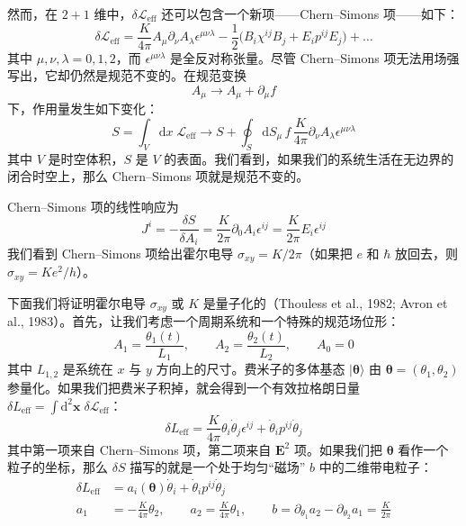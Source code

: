 然而，在 $2+1$ 维中，$\delta\mathcal{L}_{\mathrm{eff}}$ 还可以包含一个新项——Chern--Simons 项——如下：
\begin{equation*}
\delta\mathcal{L}_{\mathrm{eff}} = \frac{K}{4\pi} A_{\mu} \partial_{\nu} A_{\lambda} \epsilon^{\mu\nu\lambda} - \frac{1}{2} \big( B_{i} \chi^{ij} B_{j} + E_{i} p^{ij} E_{j} \big) + \dots
\end{equation*}
其中 $\mu, \nu, \lambda = 0, 1, 2$，而 $\epsilon^{\mu\nu\lambda}$ 是全反对称张量。尽管 Chern--Simons 项无法用场强写出，它却仍然是规范不变的。在规范变换
\begin{equation*}
A_{\mu} \to A_{\mu} + \partial_{\mu} f
\end{equation*}
下，作用量发生如下变化：
\begin{equation*}
S = \int_{V} \mathrm{d}x\; \mathcal{L}_{\mathrm{eff}} \to S + \oint_{S} \mathrm{d}S_{\mu}\, f\, \frac{K}{4\pi} \partial_{\nu} A_{\lambda} \epsilon^{\mu\nu\lambda}
\end{equation*}
其中 $V$ 是时空体积，$S$ 是 $V$ 的表面。我们看到，如果我们的系统生活在无边界的闭合时空上，那么 Chern--Simons 项就是规范不变的。

Chern--Simons 项的线性响应为
\begin{equation*}
J^{i} = -\frac{\delta S}{\delta A_{i}} = \frac{K}{2\pi} \partial_{0} A_{i} \epsilon^{ij} = \frac{K}{2\pi} E_{i} \epsilon^{ij}
\end{equation*}
我们看到 Chern--Simons 项给出霍尔电导 $\sigma_{xy} = K/2\pi$（如果把 $e$ 和 $\hbar$ 放回去，则 $\sigma_{xy} = Ke^{2}/h$）。

下面我们将证明霍尔电导 $\sigma_{xy}$ 或 $K$ 是量子化的（Thouless et al., 1982; Avron et al., 1983）。首先，让我们考虑一个周期系统和一个特殊的规范场位形：
\begin{equation*}
A_{1} = \frac{\theta_{1}(t)}{L_{1}}, \qquad A_{2} = \frac{\theta_{2}(t)}{L_{2}}, \qquad A_{0} = 0 \tag{4.4.1}
\end{equation*}
其中 $L_{1,2}$ 是系统在 $x$ 与 $y$ 方向上的尺寸。费米子的多体基态 $|\pmb{\theta}\rangle$ 由 $\pmb{\theta} = (\theta_{1}, \theta_{2})$ 参量化。如果我们把费米子积掉，就会得到一个有效拉格朗日量 $\delta L_{\mathrm{eff}} = \int \mathrm{d}^{2}\pmb{x}\; \delta\mathcal{L}_{\mathrm{eff}}$：
\begin{equation*}
\delta L_{\mathrm{eff}} = \frac{K}{4\pi} \theta_{i} \dot{\theta}_{j} \epsilon^{ij} + \dot{\theta}_{i} p^{ij} \dot{\theta}_{j}
\end{equation*}
其中第一项来自 Chern--Simons 项，第二项来自 $\pmb{E}^{2}$ 项。如果我们把 $\pmb{\theta}$ 看作一个粒子的坐标，那么 $\delta S$ 描写的就是一个处于均匀``磁场'' $b$ 中的二维带电粒子：
\begin{align*}
\delta L_{\mathrm{eff}} &= a_{i}(\pmb{\theta}) \dot{\theta}_{i} + \dot{\theta}_{i} p^{ij} \dot{\theta}_{j}\\
a_{1} &= -\frac{K}{4\pi} \theta_{2}, \qquad a_{2} = \frac{K}{4\pi} \theta_{1}, \qquad b = \partial_{\theta_{1}} a_{2} - \partial_{\theta_{2}} a_{1} = \frac{K}{2\pi}
\end{align*}

